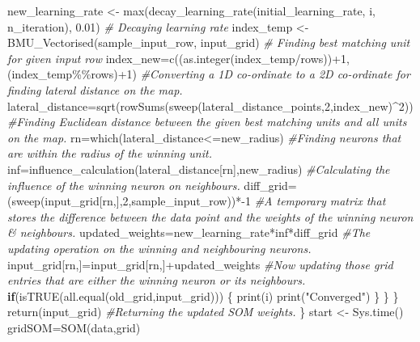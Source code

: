 \documentclass[
]{article}
\newenvironment{Shaded}{\begin{snugshade}}{\end{snugshade}}
\newcommand{\CommentTok}[1]{\textcolor[rgb]{0.56,0.35,0.01}{\textit{#1}}}
\newcommand{\ControlFlowTok}[1]{\textcolor[rgb]{0.13,0.29,0.53}{\textbf{#1}}}
\newcommand{\DecValTok}[1]{\textcolor[rgb]{0.00,0.00,0.81}{#1}}
\newcommand{\FloatTok}[1]{\textcolor[rgb]{0.00,0.00,0.81}{#1}}
\newcommand{\FunctionTok}[1]{\textcolor[rgb]{0.00,0.00,0.00}{#1}}
\newcommand{\NormalTok}[1]{#1}
\newcommand{\OtherTok}[1]{\textcolor[rgb]{0.56,0.35,0.01}{#1}}
\newcommand{\SpecialCharTok}[1]{\textcolor[rgb]{0.00,0.00,0.00}{#1}}
\newcommand{\StringTok}[1]{\textcolor[rgb]{0.31,0.60,0.02}{#1}}
\begin{document}
\begin{Shaded}
\begin{Highlighting}[]
\NormalTok{      new\_learning\_rate }\OtherTok{\textless{}{-}} \FunctionTok{max}\NormalTok{(}\FunctionTok{decay\_learning\_rate}\NormalTok{(initial\_learning\_rate, i, n\_iteration), }\FloatTok{0.01}\NormalTok{) }\CommentTok{\# Decaying learning rate}
\NormalTok{      index\_temp }\OtherTok{\textless{}{-}} \FunctionTok{BMU\_Vectorised}\NormalTok{(sample\_input\_row, input\_grid) }\CommentTok{\# Finding best matching unit for given input row}
\NormalTok{      index\_new}\OtherTok{=}\FunctionTok{c}\NormalTok{((}\FunctionTok{as.integer}\NormalTok{(index\_temp}\SpecialCharTok{/}\NormalTok{rows))}\SpecialCharTok{+}\DecValTok{1}\NormalTok{,(index\_temp}\SpecialCharTok{\%\%}\NormalTok{rows)}\SpecialCharTok{+}\DecValTok{1}\NormalTok{) }\CommentTok{\#Converting a 1D co{-}ordinate to a 2D co{-}ordinate for finding lateral distance on the map.}
\NormalTok{      lateral\_distance}\OtherTok{=}\FunctionTok{sqrt}\NormalTok{(}\FunctionTok{rowSums}\NormalTok{(}\FunctionTok{sweep}\NormalTok{(lateral\_distance\_points,}\DecValTok{2}\NormalTok{,index\_new)}\SpecialCharTok{\^{}}\DecValTok{2}\NormalTok{)) }\CommentTok{\#Finding Euclidean distance between the given best matching units and all units on the map.}
\NormalTok{      rn}\OtherTok{=}\FunctionTok{which}\NormalTok{(lateral\_distance}\SpecialCharTok{\textless{}=}\NormalTok{new\_radius) }\CommentTok{\#Finding neurons that are within the radius of the winning unit.}
\NormalTok{      inf}\OtherTok{=}\FunctionTok{influence\_calculation}\NormalTok{(lateral\_distance[rn],new\_radius) }\CommentTok{\#Calculating the influence of the winning neuron on neighbours.}
\NormalTok{      diff\_grid}\OtherTok{=}\NormalTok{(}\FunctionTok{sweep}\NormalTok{(input\_grid[rn,],}\DecValTok{2}\NormalTok{,sample\_input\_row))}\SpecialCharTok{*{-}}\DecValTok{1} \CommentTok{\#A temporary matrix that stores the difference between the data point and the weights of the winning neuron \& neighbours.}
\NormalTok{      updated\_weights}\OtherTok{=}\NormalTok{new\_learning\_rate}\SpecialCharTok{*}\NormalTok{inf}\SpecialCharTok{*}\NormalTok{diff\_grid }\CommentTok{\#The updating operation on the winning and neighbouring neurons.}
\NormalTok{      input\_grid[rn,]}\OtherTok{=}\NormalTok{input\_grid[rn,]}\SpecialCharTok{+}\NormalTok{updated\_weights }\CommentTok{\#Now updating those grid entries that are either the winning neuron or its neighbours.}
      \ControlFlowTok{if}\NormalTok{(}\FunctionTok{isTRUE}\NormalTok{(}\FunctionTok{all.equal}\NormalTok{(old\_grid,input\_grid)))}
\NormalTok{      \{}
        \FunctionTok{print}\NormalTok{(i)}
        \FunctionTok{print}\NormalTok{(}\StringTok{"Converged"}\NormalTok{)}
\NormalTok{      \}}
\NormalTok{    \}}
\NormalTok{  \}}
  \FunctionTok{return}\NormalTok{(input\_grid) }\CommentTok{\#Returning the updated SOM weights.}
\NormalTok{\}}
\NormalTok{start }\OtherTok{\textless{}{-}} \FunctionTok{Sys.time}\NormalTok{()}
\NormalTok{gridSOM}\OtherTok{=}\FunctionTok{SOM}\NormalTok{(data,grid)}
\end{Highlighting}
\end{Shaded}
\end{document}
